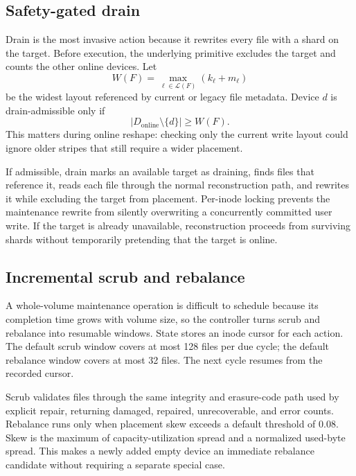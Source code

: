 \subsection{Safety-gated drain}
\label{sec:safe-drain}
Drain is the most invasive action because it rewrites every file with a shard on the target. Before execution, the underlying \argosfs{} primitive excludes the target and counts the other online devices. Let
\begin{equation}
  W(F)=\max_{\ell \in \mathcal{L}(F)}(k_\ell+m_\ell)
\end{equation}
be the widest layout referenced by current or legacy file metadata. Device $d$ is drain-admissible only if
\begin{equation}
  |D_{\mathrm{online}}\setminus\{d\}| \ge W(F).
  \label{eq:drain-precondition}
\end{equation}
This matters during online reshape: checking only the current write layout could ignore older stripes that still require a wider placement.

If admissible, drain marks an available target as draining, finds files that reference it, reads each file through the normal reconstruction path, and rewrites it while excluding the target from placement. Per-inode locking prevents the maintenance rewrite from silently overwriting a concurrently committed user write. If the target is already unavailable, reconstruction proceeds from surviving shards without temporarily pretending that the target is online.

\subsection{Incremental scrub and rebalance}
\label{sec:incremental-maintenance}
A whole-volume maintenance operation is difficult to schedule because its completion time grows with volume size, so the controller turns scrub and rebalance into resumable windows. State stores an inode cursor for each action. The default scrub window covers at most 128 files per due cycle; the default rebalance window covers at most 32 files. The next cycle resumes from the recorded cursor.

Scrub validates files through the same integrity and erasure-code path used by explicit repair, returning damaged, repaired, unrecoverable, and error counts. Rebalance runs only when placement skew exceeds a default threshold of 0.08. Skew is the maximum of capacity-utilization spread and a normalized used-byte spread. This makes a newly added empty device an immediate rebalance candidate without requiring a separate special case.

